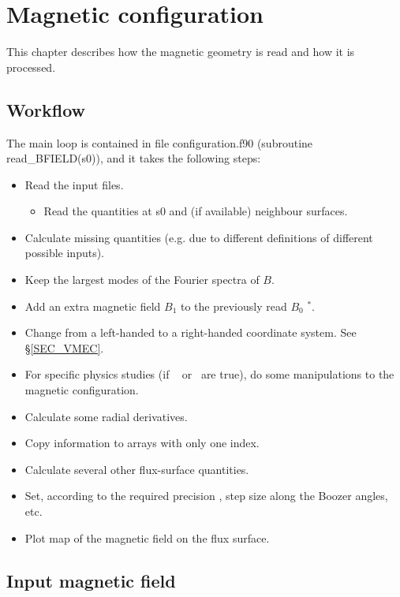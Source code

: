 \chapter{Magnetic configuration}\label{CHAP_CONF}

This chapter describes how the magnetic geometry is read and how it is processed.

\section{Workflow}

The main loop is contained in file {\ttfamily configuration.f90} (subroutine {\ttfamily read\_BFIELD(s0)}), and it takes the following steps:

\begin{itemize}
\item Read the input files.
\begin{itemize}
\item Read the quantities at {\ttfamily s0} and (if available) neighbour surfaces.
\end{itemize}
\item Calculate missing quantities (e.g. due to different definitions of different possible inputs).
\item Keep the largest  modes of the Fourier spectra of $B$.
\item Add an extra magnetic field $B_1$ to the previously read $B_0$ $^*$.
\item Change from a left-handed to a right-handed coordinate system. See \S\ref{SEC_VMEC}.
\item For specific physics studies (if ~ or~ are true), do some manipulations to the magnetic configuration.
\item Calculate some radial derivatives.
\item Copy information to arrays with only one index.
\item Calculate several other flux-surface quantities.
\item Set, according to the required precision , step size along the Boozer angles, etc.
\item Plot map of the magnetic field on the flux surface.
\end{itemize}



\section{Input magnetic field}\label{SEC_BINPUT}


